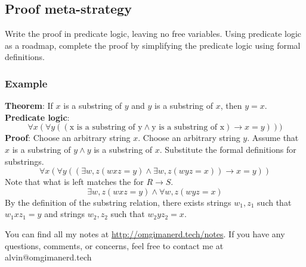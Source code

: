 \documentclass[letterpaper, 12pt]{math}
\begin{document}
\subsection*{Proof meta-strategy}
Write the proof in predicate logic, leaving no free variables. Using predicate
logic as a roadmap, complete the proof by simplifying the predicate logic
using formal definitions.

\subsubsection*{Example}
\textbf{Theorem}: If \( x \) is a substring of \( y \) and \( y \) is a
substring of \( x \), then \( y = x \). \\
\textbf{Predicate logic}:
\[ \forall{x}(\forall{y}((\text{x is a substring of y}\wedge\text{y is a
  substring of x})\to x = y))) \]
\textbf{Proof}: Choose an arbitrary string \( x \). Choose an arbitrary string
\( y \). Assume that \( x \) is a substring of \( y\wedge y \) is a substring of
\( x \). Substitute the formal definitions for substrings.
\[ \forall{x}(\forall{y}((\exists{w,z}(wxz = y)\wedge\exists{w,z}(wyz = x))\to
  x = y)) \]
Note that what is left matches the for \( R\to S \).
\[ \exists{w,z}(wxz = y)\wedge\forall{w,z}(wyz = x) \]
By the definition of the substring relation, there exists strings \( w_1,z_1 \)
such that \( w_1xz_1 = y \) and strings \( w_2,z_2 \) such that
\( w_2yz_2 = x \).

\begin{center}
  You can find all my notes at \url{http://omgimanerd.tech/notes}. If you have
  any questions, comments, or concerns, feel free to contact me at
  alvin@omgimanerd.tech
\end{center}
\end{document}
